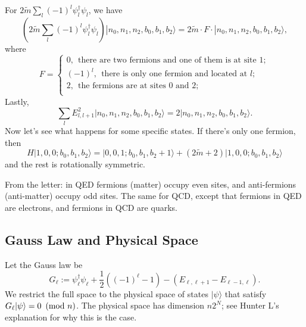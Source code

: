	For $2\tilde{m}\sum_{l} (-1)^l \psi_l^\dagger \psi_l$, we have
	\[
	(2\tilde{m}\sum_{l} (-1)^l \psi_l^\dagger \psi_l) |n_0,n_1,n_2,b_0,b_1,b_2\rangle  = 2 \tilde{m} \cdot F \cdot |n_0,n_1,n_2,b_0,b_1,b_2\rangle,
	\]
	where 
	\[
	F = \begin{cases}
	0, \ \ \text{there are two fermions and one of them is at site }1;\\
	(-1)^l, \ \ \text{there is only one fermion and located at } l;\\
	2, \ \ \text{the fermions are at sites }0\text{ and }2;\\
	
	\end{cases}
	\]
	Lastly,
	\[
	\sum_l E^2_{l,l+1} |n_0,n_1,n_2,b_0,b_1,b_2\rangle = 2|n_0,n_1,n_2,b_0,b_1,b_2\rangle.
	\]
	Now let's see what happens for some specific states. If there's only one fermion, then
	\[
	H|1,0,0; b_0,b_1,b_2\rangle = |0,0,1; b_0,b_1,b_2+1\rangle + (2\tilde{m}+2)|1,0,0; b_0,b_1,b_2\rangle 
	\]
	and the rest is rotationally symmetric.
	
	
	From the letter: in QED fermions (matter) occupy even sites, and anti-fermions (anti-matter) occupy odd sites. The same for QCD, except that fermions in QED are electrons, and fermions in QCD are quarks.
	
	\subsection{Gauss Law and Physical Space}
	Let the Gauss law be
		\begin{equation}\label{eq:1dQED_Gauss_law}
	G_\ell := \psi_\ell^\dagger \psi_\ell + \frac{1}{2}((-1)^\ell -1)-(E_{\ell,\ell+1}-E_{\ell-1,\ell}).
	\end{equation}
	We restrict the full space to the physical space of states $|\psi\rangle$ that satisfy
	$G_\ell|\psi\rangle= 0 \ \left(\mathrm{mod}\ n\right)$. 
	The physical space has dimension $n 2^N$; see Hunter L's explanation for why this is the case.
	
